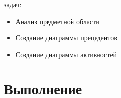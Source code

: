 \documentclass[14pt]{extreport}
\begin{document}
 задач:
\begin{itemize}
    \item Анализ предметной области 
    \item Создание диаграммы прецедентов
    \item Создание диаграммы активностей
\end{itemize}


\chapter{Выполнение}

\conclusions

\begin{thebibliography}{2}

\end{thebibliography}
\end{document}
